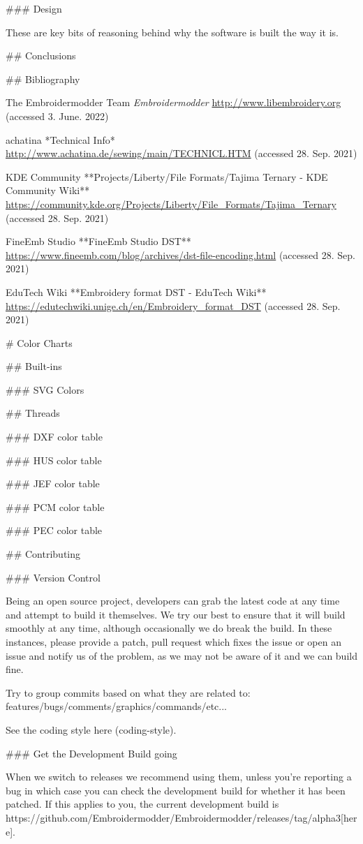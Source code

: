 ### Design

These are key bits of reasoning behind why the software is built the way
it is.

## Conclusions

## Bibliography

The Embroidermodder Team \emph{Embroidermodder}
\url{http://www.libembroidery.org} (accessed 3. June. 2022)

achatina *Technical Info*
\url{http://www.achatina.de/sewing/main/TECHNICL.HTM} (accessed 28. Sep. 2021)

KDE Community
**Projects/Liberty/File Formats/Tajima Ternary - KDE Community Wiki**
\url{https://community.kde.org/Projects/Liberty/File_Formats/Tajima_Ternary}
(accessed 28. Sep. 2021)

FineEmb Studio
**FineEmb Studio \guillemotright DST**
\url{https://www.fineemb.com/blog/archives/dst-file-encoding.html}
(accessed 28. Sep. 2021)

EduTech Wiki
**Embroidery format DST - EduTech Wiki**
\url{https://edutechwiki.unige.ch/en/Embroidery_format_DST}
(accessed 28. Sep. 2021)

# Color Charts

## Built-ins

### SVG Colors

## Threads

### DXF color table

### HUS color table

### JEF color table

### PCM color table

### PEC color table

## Contributing

### Version Control

Being an open source project, developers can grab the latest code at any time
and attempt to build it themselves. We try our best to ensure that it will build smoothly
at any time, although occasionally we do break the build. In these instances,
please provide a patch, pull request which fixes the issue or open an issue and
notify us of the problem, as we may not be aware of it and we can build fine.

Try to group commits based on what they are related to: features/bugs/comments/graphics/commands/etc...

See the coding style  here (coding-style).

### Get the Development Build going

When we switch to releases we recommend using them, unless you're reporting a bug in which case you can check the development build for whether it has been patched. If this applies to you, the current development build is https://github.com/Embroidermodder/Embroidermodder/releases/tag/alpha3[here].

